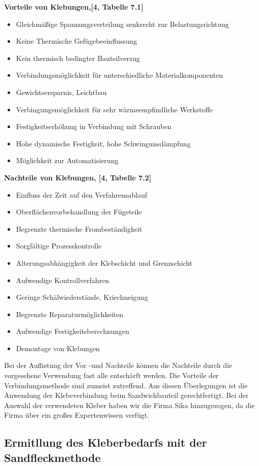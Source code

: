 \documentclass[12 pt,a4 paper ]{scrreprt}
\begin{document}
\textbf{Vorteile von Klebungen,[4, Tabelle 7.1]}
\begin{itemize}
	\item Gleichmäßige Spannungsverteilung senkrecht zur Belastungsrichtung 
	\item Keine Thermische Gefügebeeinflussung
	\item Kein thermisch bedingter Bauteilverzug
	\item Verbindungsmöglichkeit für unterschiedliche Materialkomponenten
	\item Gewichtsersparnis, Leichtbau
	\item Verbingungsmöglichkeit für sehr wärmeempfindliche Werkstoffe
	\item Festigkeitserhöhung in Verbindung mit Schrauben
	\item Hohe dynamische Festigkeit, hohe Schwingunsdämpfung
	\item Möglichkeit zur Automatisierung
\end{itemize}


\textbf{Nachteile von Klebungen, [4, Tabelle 7.2]}

\begin{itemize}
	\item Einfluss der Zeit auf den Verfahrensablauf
	\item Oberflächenvorbehandlung der Fügeteile
	\item Begrenzte thermische Frombeständigkeit
	\item Sorgfältige Prozesskontrolle
	\item Alterungsabhängigkeit der Klebschicht und Grenzschicht
	\item Aufwendige Kontrollverfahren
	\item Geringe Schälwiederstände, Kriechneigung
	\item Begrenzte Reparaturmöglichkeiten
	\item Aufwendige Festigkeitsberechnungen
	\item Demontage von Klebungen
	\end{itemize}

Bei der Auflistung der Vor -und Nachteile können die Nachteile durch die vorgesehene Verwendung fast alle entschärft werden. Die Vorteile der Verbindungsmethode sind zumeist zutreffend. Aus diesen Überlegungen ist die Anwendung der Klebeverbindung beim Sandwichbauteil gerechtfertigt.
Bei der Auswahl der verwendeten Kleber haben wir die Firma Sika hinzugezogen, da die Firma über ein großes Expertenwissen verfügt. 


\subsection{Ermitllung des Kleberbedarfs mit der Sandfleckmethode}
\end{document}
